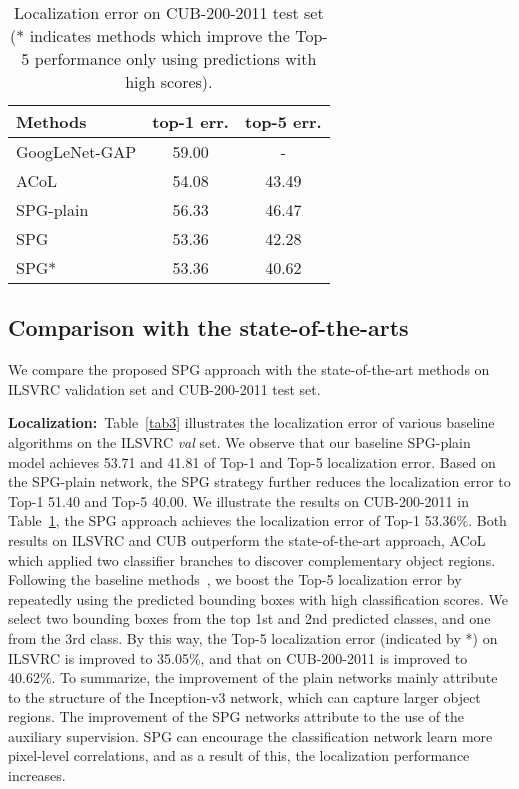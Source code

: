 \documentclass[runningheads]{llncs}
\begin{document}
\begin{table}\setlength{\tabcolsep}{14pt}
  \centering
\caption{Localization error on CUB-200-2011 test set (* indicates methods which improve the Top-5 performance only using predictions with high scores).}\label{tab4}
  \begin{tabular}{l|c|c}
    \hline
    \hline
    Methods & top-1 err. & top-5 err. \\
    \hline
    GoogLeNet-GAP \cite{zhou2015cnnlocalization} & 59.00 & - \\
    ACoL \cite{zhang2018adversarial} & 54.08 & 43.49 \\
    \hline
    SPG-plain & 56.33 & 46.47 \\
    SPG & 53.36 & 42.28 \\
    SPG* & 53.36 & 40.62  \\
    \hline
    \hline
  \end{tabular}
\end{table}

\subsection{Comparison with the state-of-the-arts}
We compare the proposed SPG approach with the state-of-the-art methods on ILSVRC validation set and CUB-200-2011 test set.

\textbf{Localization:}~Table~\ref{tab3}
illustrates the localization error of various baseline algorithms on the ILSVRC \emph{val} set.
We observe that our baseline SPG-plain model achieves 53.71 and 41.81 of Top-1 and Top-5 localization error.
Based on the SPG-plain network, the SPG strategy further reduces the localization error to Top-1 51.40 and Top-5 40.00.
We illustrate the results on CUB-200-2011 in Table~\ref{tab4}, the SPG approach achieves the localization error of Top-1 53.36\%.
Both results on ILSVRC and CUB outperform the state-of-the-art approach, ACoL~\cite{zhang2018adversarial} which applied two classifier branches to discover complementary object regions.
Following the baseline methods~\cite{zhou2015cnnlocalization,zhang2018adversarial}, we boost the Top-5 localization error by repeatedly using the predicted bounding boxes with high classification scores. 
We select two bounding boxes from the top 1st and 2nd predicted classes, and one from the 3rd class. 
By this way, the Top-5 localization error (indicated by *) on ILSVRC is improved to 35.05\%, and that on CUB-200-2011 is improved to 40.62\%.
To summarize, the improvement of the plain networks mainly attribute to the structure of the Inception-v3 network, which can capture larger object regions.
The improvement of the SPG networks attribute to the use of the auxiliary supervision. 
SPG can encourage the classification network learn more pixel-level correlations, and as a result of this, the localization performance increases.
\end{document}
